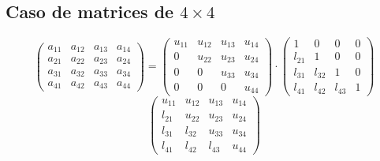 \documentclass[10pt,a4paper,dvipdfmx]{article}
\begin{document}
\subsection{Caso de matrices de $4\times 4$ }
$$ \left( 
\begin{array}{cccc}
a_{{1}{1}} & a_{{1}{2}} & a_{{1}{3}} & a_{{1}{4}} \\
a_{{2}{1}} & a_{{2}{2}} & a_{{2}{3}} & a_{{2}{4}} \\
a_{{3}{1}} & a_{{3}{2}} & a_{{3}{3}} & a_{{3}{4}} \\
a_{{4}{1}} & a_{{4}{2}} & a_{{4}{3}} & a_{{4}{4}} 
 \end{array}
\right)
 = \left( 
\begin{array}{cccc}
u_{{1}{1}} & u_{{1}{2}} & u_{{1}{3}} & u_{{1}{4}} \\
0 & u_{{2}{2}} & u_{{2}{3}} & u_{{2}{4}} \\
0 & 0 & u_{{3}{3}} & u_{{3}{4}} \\
0 & 0 & 0 & u_{{4}{4}} 
 \end{array}
\right)
 \cdot \left( 
\begin{array}{cccc}
1 & 0 & 0 & 0 \\
l_{{2}{1}} & 1 & 0 & 0 \\
l_{{3}{1}} & l_{{3}{2}} & 1 & 0 \\
l_{{4}{1}} & l_{{4}{2}} & l_{{4}{3}} & 1 
 \end{array}
\right)
 $$
$$ \left( 
\begin{array}{cccc}
u_{{1}{1}} & u_{{1}{2}} & u_{{1}{3}} & u_{{1}{4}} \\
l_{{2}{1}} & u_{{2}{2}} & u_{{2}{3}} & u_{{2}{4}} \\
l_{{3}{1}} & l_{{3}{2}} & u_{{3}{3}} & u_{{3}{4}} \\
l_{{4}{1}} & l_{{4}{2}} & l_{{4}{3}} & u_{{4}{4}} 
 \end{array}
\right)
 $$
\end{document}
